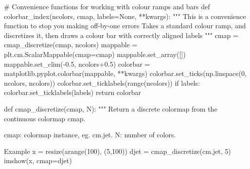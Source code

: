 \documentclass[
  letterpaper,
  DIV=11,
  numbers=noendperiod]{scrreprt}
\newenvironment{Shaded}{\begin{snugshade}}{\end{snugshade}}
\newcommand{\BuiltInTok}[1]{\textcolor[rgb]{0.00,0.23,0.31}{#1}}
\newcommand{\CommentTok}[1]{\textcolor[rgb]{0.37,0.37,0.37}{#1}}
\newcommand{\ControlFlowTok}[1]{\textcolor[rgb]{0.00,0.23,0.31}{#1}}
\newcommand{\DecValTok}[1]{\textcolor[rgb]{0.68,0.00,0.00}{#1}}
\newcommand{\FloatTok}[1]{\textcolor[rgb]{0.68,0.00,0.00}{#1}}
\newcommand{\KeywordTok}[1]{\textcolor[rgb]{0.00,0.23,0.31}{#1}}
\newcommand{\NormalTok}[1]{\textcolor[rgb]{0.00,0.23,0.31}{#1}}
\newcommand{\OperatorTok}[1]{\textcolor[rgb]{0.37,0.37,0.37}{#1}}
\newcommand{\VariableTok}[1]{\textcolor[rgb]{0.07,0.07,0.07}{#1}}
\begin{document}
\begin{Shaded}
\begin{Highlighting}[]

\CommentTok{\# Convenience functions for working with colour ramps and bars}
\KeywordTok{def}\NormalTok{ colorbar\_index(ncolors, cmap, labels}\OperatorTok{=}\VariableTok{None}\NormalTok{, }\OperatorTok{**}\NormalTok{kwargs):}
    \CommentTok{"""}
\CommentTok{    This is a convenience function to stop you making off{-}by{-}one errors}
\CommentTok{    Takes a standard colour ramp, and discretizes it,}
\CommentTok{    then draws a colour bar with correctly aligned labels}
\CommentTok{    """}
\NormalTok{    cmap }\OperatorTok{=}\NormalTok{ cmap\_discretize(cmap, ncolors)}
\NormalTok{    mappable }\OperatorTok{=}\NormalTok{ plt.cm.ScalarMappable(cmap}\OperatorTok{=}\NormalTok{cmap)}
\NormalTok{    mappable.set\_array([])}
\NormalTok{    mappable.set\_clim(}\OperatorTok{{-}}\FloatTok{0.5}\NormalTok{, ncolors}\OperatorTok{+}\FloatTok{0.5}\NormalTok{)}
\NormalTok{    colorbar }\OperatorTok{=}\NormalTok{ matplotlib.pyplot.colorbar(mappable, }\OperatorTok{**}\NormalTok{kwargs)}
\NormalTok{    colorbar.set\_ticks(np.linspace(}\DecValTok{0}\NormalTok{, ncolors, ncolors))}
\NormalTok{    colorbar.set\_ticklabels(}\BuiltInTok{range}\NormalTok{(ncolors))}
    \ControlFlowTok{if}\NormalTok{ labels:}
\NormalTok{        colorbar.set\_ticklabels(labels)}
    \ControlFlowTok{return}\NormalTok{ colorbar}

\KeywordTok{def}\NormalTok{ cmap\_discretize(cmap, N):}
    \CommentTok{"""}
\CommentTok{    Return a discrete colormap from the continuous colormap cmap.}

\CommentTok{        cmap: colormap instance, eg. cm.jet. }
\CommentTok{        N: number of colors.}

\CommentTok{    Example}
\CommentTok{        x = resize(arange(100), (5,100))}
\CommentTok{        djet = cmap\_discretize(cm.jet, 5)}
\CommentTok{        imshow(x, cmap=djet)}


\end{Highlighting}
\end{Shaded}
\end{document}

